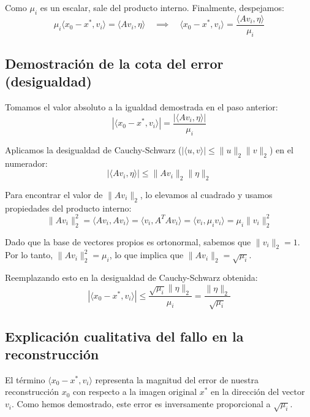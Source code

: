 \documentclass{article}
\begin{document}
\begin{enumerate}[label=\roman*., widest=ii]
  Como $\mu_i$ es un escalar, sale del producto interno. Finalmente, despejamos:
  \begin{equation*}
  \mu_i \langle x_0 - x^*, v_i \rangle = \langle A v_i, \eta \rangle \quad \implies \quad \langle x_0 - x^*, v_i \rangle = \frac{\langle A v_i, \eta \rangle}{\mu_i}
  \end{equation*}

  \subsection*{Demostración de la cota del error (desigualdad)}

  Tomamos el valor absoluto a la igualdad demostrada en el paso anterior:
  \begin{equation*}
  |\langle x_0 - x^*, v_i \rangle| = \frac{|\langle A v_i, \eta \rangle|}{\mu_i}
  \end{equation*}

  Aplicamos la desigualdad de Cauchy-Schwarz ($|\langle u, v \rangle| \leq \|u\|_2 \|v\|_2$) en el numerador:
  \begin{equation*}
  |\langle A v_i, \eta \rangle| \leq \|A v_i\|_2 \|\eta\|_2
  \end{equation*}

  Para encontrar el valor de $\|A v_i\|_2$, lo elevamos al cuadrado y usamos propiedades del producto interno:
  \begin{equation*}
  \|A v_i\|_2^2 = \langle A v_i, A v_i \rangle = \langle v_i, A^T A v_i \rangle = \langle v_i, \mu_i v_i \rangle = \mu_i \|v_i\|_2^2
  \end{equation*}

  Dado que la base de vectores propios es ortonormal, sabemos que $\|v_i\|_2 = 1$. Por lo tanto, $\|A v_i\|_2^2 = \mu_i$, lo que implica que $\|A v_i\|_2 = \sqrt{\mu_i}$.

  Reemplazando esto en la desigualdad de Cauchy-Schwarz obtenida:
  \begin{equation*}
  |\langle x_0 - x^*, v_i \rangle| \leq \frac{\sqrt{\mu_i} \|\eta\|_2}{\mu_i} = \frac{\|\eta\|_2}{\sqrt{\mu_i}}
  \end{equation*}

  \subsection*{Explicación cualitativa del fallo en la reconstrucción}

  El término $\langle x_0 - x^*, v_i \rangle$ representa la magnitud del error de nuestra reconstrucción $x_0$ con respecto a la imagen original $x^*$ en la dirección del vector $v_i$. Como hemos demostrado, este error es inversamente proporcional a $\sqrt{\mu_i}$.


\end{enumerate}
\end{document}
